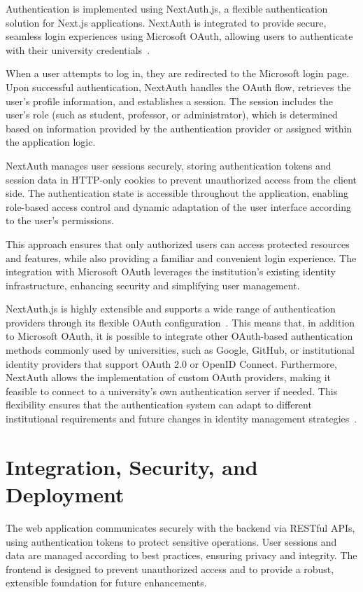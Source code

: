 Authentication is implemented using NextAuth.js, a flexible authentication solution for Next.js applications. NextAuth is integrated to provide secure, seamless login experiences using Microsoft OAuth, allowing users to authenticate with their university credentials~\cite{nextjs-authentication}.

When a user attempts to log in, they are redirected to the Microsoft login page. Upon successful authentication, NextAuth handles the OAuth flow, retrieves the user's profile information, and establishes a session. The session includes the user's role (such as student, professor, or administrator), which is determined based on information provided by the authentication provider or assigned within the application logic.

NextAuth manages user sessions securely, storing authentication tokens and session data in HTTP-only cookies to prevent unauthorized access from the client side. The authentication state is accessible throughout the application, enabling role-based access control and dynamic adaptation of the user interface according to the user's permissions.

This approach ensures that only authorized users can access protected resources and features, while also providing a familiar and convenient login experience. The integration with Microsoft OAuth leverages the institution's existing identity infrastructure, enhancing security and simplifying user management.

NextAuth.js is highly extensible and supports a wide range of authentication providers through its flexible OAuth configuration~\cite{nextjs-authentication}. This means that, in addition to Microsoft OAuth, it is possible to integrate other OAuth-based authentication methods commonly used by universities, such as Google, GitHub, or institutional identity providers that support OAuth 2.0 or OpenID Connect. Furthermore, NextAuth allows the implementation of custom OAuth providers, making it feasible to connect to a university's own authentication server if needed. This flexibility ensures that the authentication system can adapt to different institutional requirements and future changes in identity management strategies~\cite{nextjs-authentication}.

\section{Integration, Security, and Deployment}

The web application communicates securely with the backend via RESTful APIs, using authentication tokens to protect sensitive operations. User sessions and data are managed according to best practices, ensuring privacy and integrity. The frontend is designed to prevent unauthorized access and to provide a robust, extensible foundation for future enhancements.

